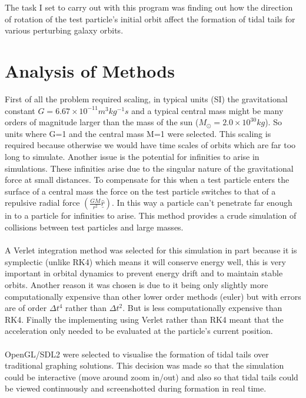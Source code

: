 \documentclass[10pt,a4paper]{article}
\begin{document}
\\
\\
The task I set to carry out with this program was finding out how the direction of rotation of the test particle's initial orbit affect the formation of tidal tails for various perturbing galaxy orbits.

\clearpage
\section{Analysis of Methods}
First of all the problem required scaling, in typical units (SI) the gravitational constant $G=6.67\times10^{-11} m^3 kg^{-1} s$ and a typical central mass might be many orders of magnitude larger than the mass of the sun ($M_\odot=2.0\times10^{30 } kg$). So units where G=1 and the central mass M=1 were selected. This scaling is required because otherwise we would have time scales of orbits which are far too long to simulate. Another issue is the potential for infinities to arise in simulations. These infinities arise due to the singular nature of the gravitational force at small distances. To compensate for this when a test particle enters the surface of a central mass the force on the test particle switches to that of a repulsive radial force $(\frac{GM}{r^2} \underline{\hat{r}})$. In this way a particle can't penetrate far enough in to a particle for infinities to arise. This method provides a crude simulation of collisions between test particles and large masses.
\\
\\
A Verlet integration method was selected for this simulation in part because it is symplectic (unlike RK4) which means it will conserve energy well, this is very important in orbital dynamics to prevent energy drift and to maintain stable orbits. Another reason it was chosen is due to it being only slightly more computationally expensive than other lower order methods (euler) but with errors are of order $\Delta t^4$ rather than $\Delta t^2$. But is less computationally expensive than RK4. Finally the implementing using Verlet rather than RK4 meant that the acceleration only needed to be evaluated at the particle's current position.
\\
\\
OpenGL/SDL2 were selected to visualise the formation of tidal tails over traditional graphing solutions. This decision was made so that the simulation could be interactive (move around zoom in/out) and also so that tidal tails could be viewed continuously and screenshotted during formation in real time.
\clearpage
\end{document}
